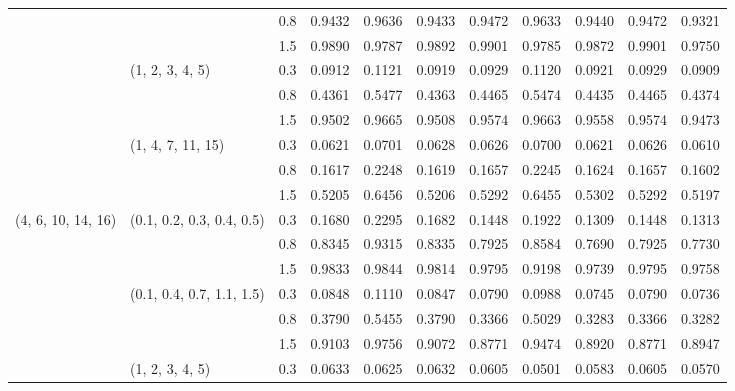 \begin{table}[h]
\begin{tabular}{lllllllllll}
                     		&                           		& 0.8   	& 0.9432 	& 0.9636 	& 0.9433 	& 0.9472 	& 0.9633 	& 0.9440 	& 0.9472 	& 0.9321 \\
                     		&                           		& 1.5   	& 0.9890 	& 0.9787 	& 0.9892 	& 0.9901 	& 0.9785 	& 0.9872 	& 0.9901 	& 0.9750 \\
                     		& (1, 2, 3, 4, 5)          		& 0.3   	& 0.0912 	& 0.1121 	& 0.0919 	& 0.0929 	& 0.1120 	& 0.0921 	& 0.0929 	& 0.0909 \\
                     		&                           		& 0.8   	& 0.4361 	& 0.5477 	& 0.4363 	& 0.4465 	& 0.5474 	& 0.4435 	& 0.4465 	& 0.4374 \\
                     		&                           		& 1.5   	& 0.9502 	& 0.9665 	& 0.9508 	& 0.9574 	& 0.9663 	& 0.9558 	& 0.9574 	& 0.9473 \\
                     		& (1, 4, 7, 11, 15)         	& 0.3   	& 0.0621 	& 0.0701 	& 0.0628 	& 0.0626 	& 0.0700 	& 0.0621 	& 0.0626 	& 0.0610 \\
                     		&                           		& 0.8   	& 0.1617 	& 0.2248 	& 0.1619 	& 0.1657 	& 0.2245 	& 0.1624 	& 0.1657 	& 0.1602 \\
                     		&                           		& 1.5   	& 0.5205 	& 0.6456 	& 0.5206 	& 0.5292 	& 0.6455 	& 0.5302 	& 0.5292 	& 0.5197 \\\hline
(4, 6, 10, 14, 16)   	& (0.1, 0.2, 0.3, 0.4, 0.5) 	& 0.3   	& 0.1680 	& 0.2295 	& 0.1682 	& 0.1448 	& 0.1922 	& 0.1309 	& 0.1448 	& 0.1313 \\
                     		&                           		& 0.8   	& 0.8345 	& 0.9315 	& 0.8335 	& 0.7925 	& 0.8584 	& 0.7690 	& 0.7925 	& 0.7730 \\
                     		&                           		& 1.5   	& 0.9833 	& 0.9844 	& 0.9814 	& 0.9795 	& 0.9198 	& 0.9739 	& 0.9795 	& 0.9758 \\
                     		& (0.1, 0.4, 0.7, 1.1, 1.5) 	& 0.3   	& 0.0848 	& 0.1110 	& 0.0847 	& 0.0790 	& 0.0988 	& 0.0745 	& 0.0790 	& 0.0736 \\
                     		&                           		& 0.8   	& 0.3790 	& 0.5455 	& 0.3790 	& 0.3366 	& 0.5029 	& 0.3283 	& 0.3366 	& 0.3282 \\
                     		&                           		& 1.5   	& 0.9103 	& 0.9756 	& 0.9072 	& 0.8771 	& 0.9474 	& 0.8920 	& 0.8771 	& 0.8947 \\
                     		& (1, 2, 3, 4, 5)           	& 0.3   	& 0.0633 	& 0.0625 	& 0.0632 	& 0.0605 	& 0.0501 	& 0.0583 	& 0.0605 	& 0.0570 \\

\end{tabular}
\end{table}
